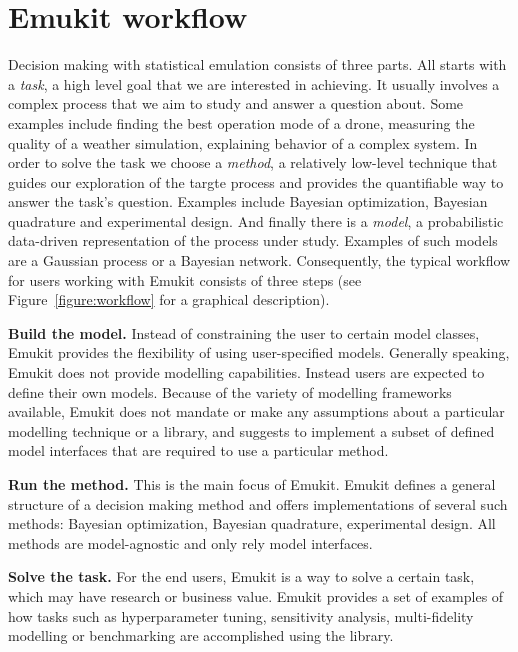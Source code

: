 \section{Emukit workflow}
Decision making with statistical emulation consists of three parts. All starts with a \textit{task}, a high level goal that we are interested in achieving. It usually involves a complex process that we aim to study and answer a question about. Some examples include finding the best operation mode of a drone, measuring the quality of a weather simulation, explaining behavior of a complex system. In order to solve the task we choose a \textit{method}, a relatively low-level technique that guides our exploration of the targte process and provides the quantifiable way to answer the task's question. Examples include Bayesian optimization, Bayesian quadrature and experimental design. And finally there is a \textit{model}, a probabilistic data-driven representation of the process under study. Examples of such models are a Gaussian process or a Bayesian network. Consequently, the typical workflow for users working with Emukit consists of three steps (see Figure~\ref{figure:workflow} for a graphical description).

\textbf{Build the model.} Instead of constraining the user to certain model classes, Emukit provides the flexibility of using user-specified models. Generally speaking, Emukit does not provide modelling capabilities. Instead users are expected to define their own models. Because of the variety of modelling frameworks available, Emukit does not mandate or make any assumptions about a particular modelling technique or a library, and suggests to implement a subset of defined model interfaces that are required to use a particular method.

\textbf{Run the method.} This is the main focus of Emukit. Emukit defines a general structure of a decision making method and offers implementations of several such methods: Bayesian optimization, Bayesian quadrature, experimental design. All methods are model-agnostic and only rely model interfaces.

\textbf{Solve the task.} For the end users, Emukit is a way to solve a certain task, which may have research or business value. Emukit provides a set of examples of how tasks such as hyperparameter tuning, sensitivity analysis, multi-fidelity modelling or benchmarking are accomplished using the library.

